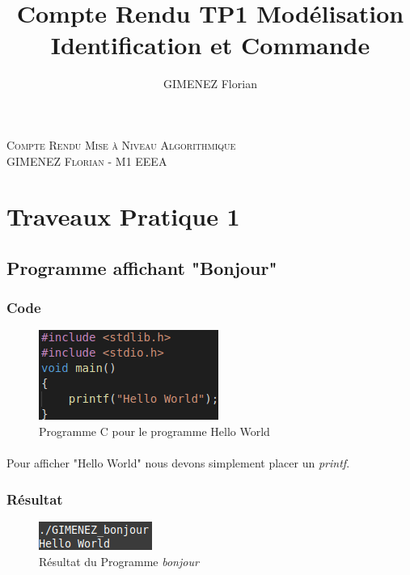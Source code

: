 \documentclass[10pt,a4paper]{article}
\author{GIMENEZ Florian}
\title{Compte Rendu TP1 Modélisation Identification et Commande}
\begin{document}
\normalem

\begin{titlepage}
	\begin{center}
	\textsc{\Large Compte Rendu Mise à Niveau Algorithmique}\\
	\textsc{GIMENEZ Florian - M1 EEEA}\\
	\end{center}

\end{titlepage}

\tableofcontents
\pagebreak

\section{Traveaux Pratique 1}

\subsection{Programme affichant "Bonjour"}
\subsubsection{Code}
	\begin{figure}[h]
	\begin{center}
	\includegraphics[scale=.4]{images/bonjour_c}
	\end{center}
	\caption{Programme C pour le programme Hello World}
	\end{figure}
\paragraph{}
    Pour afficher "Hello World" nous devons simplement placer un \emph{printf}.

\subsubsection{Résultat}
	\begin{figure}[h]
	\begin{center}
	\includegraphics[scale=.4]{images/bonjour_ex}
	\end{center}
	\caption{Résultat du Programme \emph{bonjour}}
	\end{figure}
\end{document}
